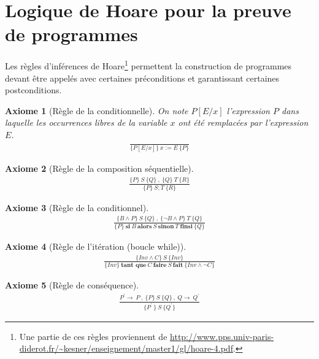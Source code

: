 \documentclass[10pt,a4paper]{article}
\newtheorem{axiom}{Axiome}[section]
\begin{document}
{\section{Logique de Hoare pour la preuve de programmes}
\label{Hoare}

Les règles d'inférences de Hoare\footnote{Une partie de ces règles proviennent de \url{http://www.pps.univ-paris-diderot.fr/~kesner/enseignement/master1/gl/hoare-4.pdf}.} permettent la construction de programmes devant être appelés avec certaines préconditions et garantissant certaines postconditions.

\begin{axiom}[Règle de la conditionnelle]
On note $P[E/x]$ l'expression $P$ dans laquelle les occurrences libres de la variable $x$ ont été remplacées par l'expression $E$.
\begin{align}
\frac{}{\{P[E/x]\}\ x:=E \ \{P\} }
\end{align}
\end{axiom}

\begin{axiom}[Règle de la composition séquentielle]
\begin{align}
\frac {\{P\}\ S\ \{Q\}\ , \ \{Q\}\ T\ \{R\} } {\{P\}\ S;T\ \{R\}}
\end{align}
\end{axiom}

\begin{axiom}[Règle de la conditionnel]
\begin{align}
\frac { \{B \wedge P\}\ S\ \{Q\}\ ,\ \{\neg B \wedge P \}\ T\ \{Q\} } { \{P\}\ \textbf{si}\ B\ \textbf{alors}\ S\ \textbf{sinon}\ T\ \textbf{finsi}\ \{Q\} }
\end{align}
\end{axiom}

\begin{axiom}[Règle de l'itération (boucle while)]
\begin{align}
\frac { \{Inv \wedge C \}\ S\ \{Inv \} } { \{Inv \}\ \textbf{tant que}\ C\ \textbf{faire}\ S\ \textbf{fait}\ \{Inv \wedge \neg C \} }
\end{align}
\end{axiom}

\begin{axiom}[Règle de conséquence]
\begin{align}
\frac { P^\prime \rightarrow\ P\ ,\ \lbrace P \rbrace\ S\ \lbrace Q \rbrace\ ,\ Q \rightarrow\ Q^\prime } { \lbrace P^\prime\ \rbrace\ S\ \lbrace Q^\prime\rbrace }
\end{align}
\end{axiom}

}
\end{document}
